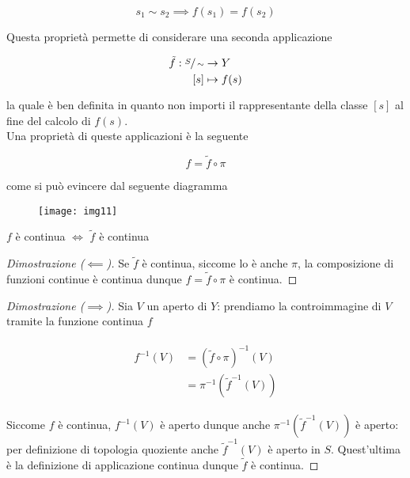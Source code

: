 \begin{equation}
	s_{1} \sim s_{2} \implies f(s_{1}) = f(s_{2})
\end{equation}

Questa proprietà permette di considerare una seconda applicazione

\begin{align}
	\begin{split}
		\tilde{f} : \sfrac{S}{\sim} &\to Y\\
		[s] &\mapsto f(s)
	\end{split}
\end{align}

la quale è ben definita in quanto non importi il rappresentante della classe $ [s] $ al fine del calcolo di $ f(s) $.\\
Una proprietà di queste applicazioni è la seguente

\begin{equation}
	f = \tilde{f} \circ \pi
\end{equation}

come si può evincere dal seguente diagramma

\begin{figure}[H]
	\centering
	\texttt{[image: img11]}
\end{figure}

\begin{definition}
	$ f $ è continua $ \iff $ $ \tilde{f} $ è continua
\end{definition}

\begin{proof}[Dimostrazione ($ \impliedby $)]
	Se $ \tilde{f} $ è continua, siccome lo è anche $ \pi $, la composizione di funzioni continue è continua dunque $ f = \tilde{f} \circ \pi $ è continua.
\end{proof}

\begin{proof}[Dimostrazione ($ \implies $)]
	Sia $ V $ un aperto di $ Y $: prendiamo la controimmagine di $ V $ tramite la funzione continua $ f $
	
	\begin{align}
		\begin{split}
			f^{-1}(V) &= (\tilde{f} \circ \pi)^{-1}(V)\\
			&= \pi^{-1}(\tilde{f}^{-1}(V))
		\end{split}
	\end{align}

	Siccome $ f $ è continua, $ f^{-1}(V) $ è aperto dunque anche $ \pi^{-1}(\tilde{f}^{-1}(V)) $ è aperto: per definizione di topologia quoziente anche $ \tilde{f}^{-1}(V) $ è aperto in $ S $. Quest'ultima è la definizione di applicazione continua dunque $ \tilde{f} $ è continua.
\end{proof}


